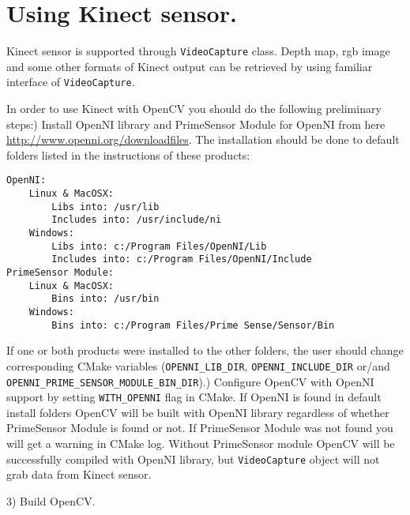 

\ifCpp
\section{Using Kinect sensor.}

Kinect sensor is supported through \texttt{VideoCapture} class. Depth map, rgb image and some other formats of Kinect 
output can be retrieved by using familiar interface of \texttt{VideoCapture}.\par

In order to use Kinect with OpenCV you should do the following preliminary steps:) Install OpenNI library and PrimeSensor Module for OpenNI from here \url{http://www.openni.org/downloadfiles}. 
The installation should be done to default folders listed in the instructions of these products:
\begin{lstlisting}
OpenNI:
	Linux & MacOSX:
		Libs into: /usr/lib
		Includes into: /usr/include/ni
	Windows:
		Libs into: c:/Program Files/OpenNI/Lib
		Includes into: c:/Program Files/OpenNI/Include
PrimeSensor Module:
	Linux & MacOSX:
		Bins into: /usr/bin
	Windows:
		Bins into: c:/Program Files/Prime Sense/Sensor/Bin
\end{lstlisting}
If one or both products were installed to the other folders, the user should change corresponding CMake variables 
(\texttt{OPENNI\_LIB\_DIR}, \texttt{OPENNI\_INCLUDE\_DIR} or/and 
\texttt{OPENNI\_PRIME\_SENSOR\_MODULE\_BIN\_DIR}).) Configure OpenCV with OpenNI support by setting \texttt{WITH\_OPENNI} flag in CMake. If OpenNI
is found in default install folders OpenCV will be built with OpenNI library regardless of whether
PrimeSensor Module is found or not. If PrimeSensor Module was not found you will get a warning
in CMake log. Without PrimeSensor module OpenCV will be successfully compiled with OpenNI library, 
but \texttt{VideoCapture} object will not grab data from Kinect sensor. \par

3) Build OpenCV.\par

